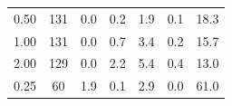 \documentclass[12pt,a4paper]{article}
\begin{document}
\begin{table}[ht!]
\begin{tabular}{|c|c|c|c|c|c|c|}
0.50                                                                                                 & 131                                                                                    & 0.0                                                                                     & 0.2                                                                                    & 1.9                                                                                     & 0.1                                                                                      & 18.3                                                                 \\
1.00                                                                                                 & 131                                                                                    & 0.0                                                                                     & 0.7                                                                                    & 3.4                                                                                     & 0.2                                                                                      & 15.7                                                                 \\
2.00                                                                                                 & 129                                                                                    & 0.0                                                                                     & 2.2                                                                                    & 5.4                                                                                     & 0.4                                                                                      & 13.0                                                                 \\ \hline
0.25                                                                                                 & 60                                                                                     & 1.9                                                                                     & 0.1                                                                                    & 2.9                                                                                     & 0.0                                                                                      & 61.0                                                                 \\

\end{tabular}
\end{table}
\end{document}
